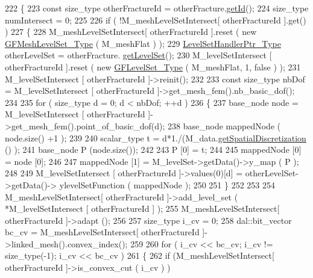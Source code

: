 \begin{DoxyCode}
222 \{
223     \textcolor{keyword}{const} size\_type otherFractureId = otherFracture.\hyperlink{classFractureHandler_a7f7ec5b15315791f76d8deb0874511d6}{getId}();
224     size\_type numIntersect = 0;
225     
226     \textcolor{keywordflow}{if} ( !M\_meshLevelSetIntersect[ otherFractureId ].\textcolor{keyword}{get}() )
227     \{
228         M\_meshLevelSetIntersect[ otherFractureId ].reset ( \textcolor{keyword}{new} 
      \hyperlink{Core_8h_a126f7165f04db4ed0b72454469145a08}{GFMeshLevelSet\_Type} ( M\_meshFlat ) );
229         \hyperlink{LevelSetHandler_8h_aba343569cb3213c103252f69c39cad0b}{LevelSetHandlerPtr\_Type} otherLevelSet = otherFracture.
      \hyperlink{classFractureHandler_af37ab12a17f812a960da2aa71699ba0f}{getLevelSet}();
230         M\_levelSetIntersect [ otherFractureId ].reset ( \textcolor{keyword}{new} \hyperlink{Core_8h_a71358a15bd3925629e26ccbb214a0133}{GFLevelSet\_Type} ( M\_meshFlat, 1,
       \textcolor{keyword}{false} )  );
231         M\_levelSetIntersect [ otherFractureId ]->reinit();
232 
233         \textcolor{keyword}{const} size\_type nbDof = M\_levelSetIntersect [ otherFractureId ]->get\_mesh\_fem().nb\_basic\_dof();
234 
235         \textcolor{keywordflow}{for} ( size\_type d = 0; d < nbDof; ++d )
236         \{
237             base\_node node = M\_levelSetIntersect [ otherFractureId ]->get\_mesh\_fem().point\_of\_basic\_dof(d);
238             base\_node mappedNode ( node.size() +1 );
239 
240             scalar\_type t = d*1./(M\_data.\hyperlink{classFractureData_a5c10d579be7849be1a126c24982f8a23}{getSpatialDiscretization} () );
241             base\_node P (node.size());
242 
243             P [0] = t;
244 
245             mappedNode [0] = node [0];
246 
247             mappedNode [1] = M\_levelSet->getData()->y\_map ( P );
248 
249             M\_levelSetIntersect [ otherFractureId ]->values(0)[d] = otherLevelSet->getData()->
      ylevelSetFunction ( mappedNode );
250 
251         \}
252 
253 
254         M\_meshLevelSetIntersect[ otherFractureId ]->add\_level\_set ( *M\_levelSetIntersect [ otherFractureId 
      ] );
255         M\_meshLevelSetIntersect[ otherFractureId ]->adapt ();
256 
257         size\_type i\_cv = 0;
258         dal::bit\_vector bc\_cv = M\_meshLevelSetIntersect[ otherFractureId ]->linked\_mesh().convex\_index();
259         
260         \textcolor{keywordflow}{for} ( i\_cv << bc\_cv; i\_cv != size\_type(-1); i\_cv << bc\_cv )
261         \{
262             \textcolor{keywordflow}{if} (M\_meshLevelSetIntersect[ otherFractureId ]->is\_convex\_cut ( i\_cv ) )

\end{DoxyCode}
